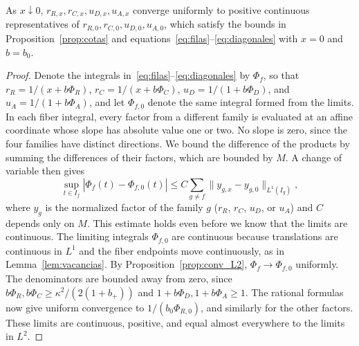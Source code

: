\begin{proposicion}\label{prop:conv_unif} As $x\downarrow0$, $r_{R,x},r_{C,x},u_{D,x},u_{A,x}$ converge uniformly
to positive continuous representatives of $r_{R,0},r_{C,0},u_{D,0},u_{A,0}$, which satisfy the bounds in Proposition~\ref{prop:cotas}
and equations~\eqref{eq:filas}--\eqref{eq:diagonales} with $x=0$ and $b=b_0$. \end{proposicion}

\begin{proof} Denote the integrals in~\eqref{eq:filas}--\eqref{eq:diagonales} by $\Phi_f$, so that $r_R=1/(x+b\Phi_R)$,
$r_C=1/(x+b\Phi_C)$, $u_D=1/(1+b\Phi_D)$, and $u_A=1/(1+b\Phi_A)$, and let $\Phi_{f,0}$ denote the same integral formed from the
limits. In each fiber integral, every factor from a different family is evaluated at an affine coordinate whose slope has absolute
value one or two. No slope is zero, since the four families have distinct directions. We bound the difference of the products by
summing the differences of their factors, which are bounded by $M$. A change of variable then gives
\begin{equation}\label{eq:fibras_unif}
 \sup_{t\in I_f}|\Phi_f(t)-\Phi_{f,0}(t)|\le C\sum_{g\ne f}\|y_{g,x}-y_{g,0}\|_{L^1(I_g)},
\end{equation} where $y_g$ is the normalized factor of the family $g$ ($r_R$, $r_C$, $u_D$, or $u_A$) and $C$ depends only on $M$. This
estimate holds even before we know that the limits are continuous. The limiting integrals $\Phi_{f,0}$ are continuous because
translations are continuous in $L^1$ and the fiber endpoints move continuously, as in Lemma~\ref{lem:vacancias}. By
Proposition~\ref{prop:conv_L2}, $\Phi_f\to\Phi_{f,0}$ uniformly. The denominators are bounded away from zero, since
$b\Phi_R,b\Phi_C\ge\kappa^2/(2(1+b_+))$ and $1+b\Phi_D,1+b\Phi_A\ge1$. The rational formulas now give uniform convergence to
$1/(b_0\Phi_{R,0})$, and similarly for the other factors. These limits are continuous, positive, and equal almost everywhere to the
limits in $L^2$. \end{proof}

